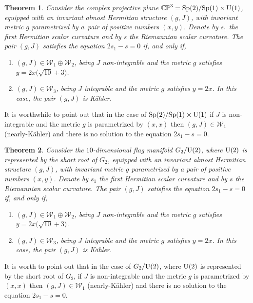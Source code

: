 \documentclass[10pt,a4paper]{amsart}
\numberwithin{equation}{section}
\newtheorem{Theorem}{Theorem}[section]
\begin{document}
\begin{Theorem}
Consider the complex projective plane $\mathbb{CP}^{3}={\rm Sp}(2)/{\rm Sp}(1)\times {\rm U}(1)$, equipped with an invariant almost Hermitian structure $(g,J)$, with invariant metric $g$ parametrized by a~pair of positive numbers $(x,y)$. Denote by $s_1$ the first Hermitian scalar curvature and by $s$ the Riemannian scalar curvature. The pair $(g,J)$ satisfies the equation $2s_1-s=0$ if, and only if,
\begin{enumerate}\itemsep=0pt
\item[$1.$] $(g,J) \in\mathcal{W}_{1}\oplus \mathcal{W}_{2}$, being $J$ non-integrable and the metric $g$ satisfies $y=2x\big(\sqrt{10} +3\big)$.
\item[$2.$] $(g,J)\in\mathcal{W}_{3}$, being $J$ integrable and the metric $g$ satisfies $y=2x$. In this case, the pair $(g,J)$ is K\"ahler.
\end{enumerate}
\end{Theorem}

\begin{Remark}
It is worthwhile to point out that in the case of ${\rm Sp}(2)/{\rm Sp}(1)\times {\rm U}(1)$ if $J$ is non-integrable and the metric $g$ is parametrized by $(x,x)$ then $(g,J)\in \mathcal{W}_1$ (nearly-K\"ahler) and there is no solution to the equation $2s_1-s=0$.
\end{Remark}

\begin{Theorem}
Consider the $10$-dimensional flag manifold $G_2/{\rm U}(2)$, where ${\rm U}(2)$ is represented by the short root of $G_2$, equipped with an invariant almost Hermitian structure $(g,J)$, with invariant metric $g$ parametrized by a pair of positive numbers $(x,y)$. Denote by $s_1$ the first Hermitian scalar curvature and by $s$ the Riemannian scalar curvature. The pair $(g,J)$ satisfies the equation $2s_1-s=0$ if, and only if,
\begin{enumerate}\itemsep=0pt
\item[$1.$] $(g,J) \in\mathcal{W}_{1}\oplus \mathcal{W}_{2}$, being $J$ non-integrable and the metric $g$ satisfies $y=2x\big(\sqrt{10} +3\big)$.
\item[$2.$] $(g,J)\in\mathcal{W}_{3}$, being $J$ integrable and the metric $g$ satisfies $y=2x$. In this case, the pair $(g,J)$ is K\"ahler.
\end{enumerate}
\end{Theorem}
\begin{Remark}
It is worth to point out that in the case of $G_2/{\rm U}(2)$, where ${\rm U}(2)$ is represented by the short root of $G_2$, if $J$ is non-integrable and the metric $g$ is parametrized by $(x,x)$ then $(g,J)\in \mathcal{W}_1$ (nearly-K\"ahler) and there is no solution to the equation $2s_1-s=0$.
\end{Remark}
\end{document}
